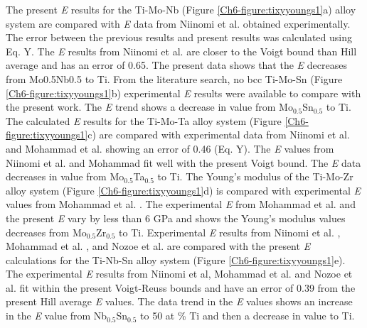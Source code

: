 The present \textit{E} results for the Ti-Mo-Nb (Figure \ref{Ch6-figure:tixyyoungs1}a) alloy system are compared with \textit{E} data from Niinomi et al. \cite{Niinomi2012} obtained experimentally. The error between the previous results and present results was calculated using Eq. Y. The \textit{E} results from Niinomi et al. are closer to the Voigt bound than Hill average and has an error of 0.65. The present data shows that the \textit{E} decreases from Mo0.5Nb0.5 to Ti. From the literature search, no bcc Ti-Mo-Sn (Figure \ref{Ch6-figure:tixyyoungs1}b) experimental \textit{E} results were available to compare with the present work. The \textit{E} trend shows a decrease in value from Mo$_{0.5}$Sn$_{0.5}$ to Ti.  The calculated \textit{E} results for the Ti-Mo-Ta alloy system (Figure \ref{Ch6-figure:tixyyoungs1}c) are compared with experimental data from Niinomi et al. \cite{Niinomi2012} and Mohammad et al. \cite{Mohammed2014} showing an error of 0.46 (Eq. Y). The \textit{E} values from Niinomi et al. and Mohammad fit well with the present Voigt bound. The \textit{E} data decreases in value from Mo$_{0.5}$Ta$_{0.5}$ to Ti. The Young's modulus of the Ti-Mo-Zr alloy system (Figure \ref{Ch6-figure:tixyyoungs1}d) is compared with experimental \textit{E} values from Mohammad et al. \cite{Mohammed2014}. The experimental \textit{E} from Mohammad et al. and the present \textit{E} vary by less than 6 GPa and shows the Young's modulus values decreases from Mo$_{0.5}$Zr$_{0.5}$ to Ti. Experimental \textit{E} results from Niinomi et al. \cite{Niinomi2012}, Mohammad et al. \cite{Mohammed2014}, and Nozoe et al. \cite{Nozoe2007} are compared with the present \textit{E} calculations for the Ti-Nb-Sn alloy system (Figure \ref{Ch6-figure:tixyyoungs1}e). The experimental \textit{E} results from Niinomi et al, Mohammad et al. and Nozoe et al. fit within the present Voigt-Reuss bounds and have an error of 0.39 from the present Hill average \textit{E} values. The data trend in the \textit{E} values shows an increase in the \textit{E} value from Nb$_{0.5}$Sn$_{0.5}$ to 50 at \% Ti and then a decrease in value to Ti.   

